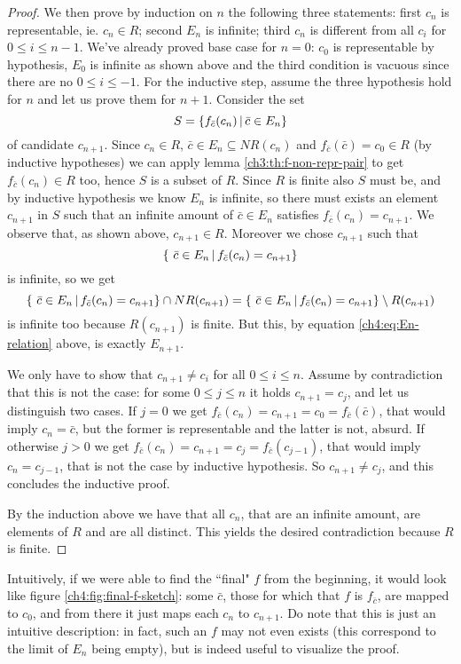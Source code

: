 \begin{proof}
	We then prove by induction on $n$ the following three statements: first $c_n$ is representable, ie. $c_n \in R$; second $E_n$ is infinite; third $c_n$ is different from all $c_i$ for $0 \le i \le n - 1$.
	We've already proved base case for $n = 0$: $c_0$ is representable by hypothesis, $E_0$ is infinite as shown above and the third condition is vacuous since there are no $0 \le i \le -1$.
	For the inductive step, assume the three hypothesis hold for $n$ and let us prove them for $n + 1$.
	Consider the set
	\[
	S = \{ f_{\bar{c}}(c_n) \,\vert\, \bar{c} \in E_n \}
	\]
	of candidate $c_{n+1}$.
	Since $c_n \in R$, $\bar{c} \in E_n \subseteq NR(c_n)$ and $f_{\bar{c}}(\bar{c}) = c_0 \in R$ (by inductive hypotheses) we can apply lemma \ref{ch3:th:f-non-repr-pair} to get $f_{\bar{c}}(c_n) \in R$ too, hence $S$ is a subset of $R$.
	Since $R$ is finite also $S$ must be, and by inductive hypothesis we know $E_n$ is infinite, so there must exists an element $c_{n+1}$ in $S$ such that an infinite amount of $\bar{c} \in E_n$ satisfies $f_{\bar{c}}(c_n) = c_{n+1}$. We observe that, as shown above, $c_{n+1} \in R$. Moreover we chose $c_{n+1}$ such that
	\[
	\{\ \bar{c} \in E_n \,\vert\, f_{\bar{c}}(c_n) = c_{n+1} \}
	\]
	is infinite, so we get
	\[
	\{\ \bar{c} \in E_n \,\vert\, f_{\bar{c}}(c_n) = c_{n+1} \} \cap NR(c_{n+1}) = \{\ \bar{c} \in E_n \,\vert\, f_{\bar{c}}(c_n) = c_{n+1} \} \setminus R(c_{n+1})
	\]
	is infinite too because $R(c_{n+1})$ is finite. But this, by equation \eqref{ch4:eq:En-relation} above, is exactly $E_{n+1}$.

	We only have to show that $c_{n+1} \neq c_i$ for all $0 \le i \le n$. Assume by contradiction that this is not the case: for some $0 \le j \le n$ it holds $c_{n+1} = c_j$, and let us distinguish two cases. If $j = 0$ we get $f_{\bar{c}}(c_n) = c_{n+1} = c_0 = f_{\bar{c}}(\bar{c})$, that would imply $c_n = \bar{c}$, but the former is representable and the latter is not, absurd. If otherwise $j > 0$ we get $f_{\bar{c}}(c_n) = c_{n+1} = c_j = f_{\bar{c}}(c_{j-1})$, that would imply $c_n = c_{j-1}$, that is not the case by inductive hypothesis. So $c_{n+1} \neq c_j$, and this concludes the inductive proof.

	By the induction above we have that all $c_n$, that are an infinite amount, are elements of $R$ and are all distinct. This yields the desired contradiction because $R$ is finite.
\end{proof}

Intuitively, if we were able to find the ``final" $f$ from the beginning, it would look like figure \ref{ch4:fig:final-f-sketch}: some $\bar{c}$, those for which that $f$ is $f_{\bar{c}}$, are mapped to $c_0$, and from there it just maps each $c_n$ to $c_{n+1}$. Do note that this is just an intuitive description: in fact, such an $f$ may not even exists (this correspond to the limit of $E_n$ being empty), but is indeed useful to visualize the proof.

